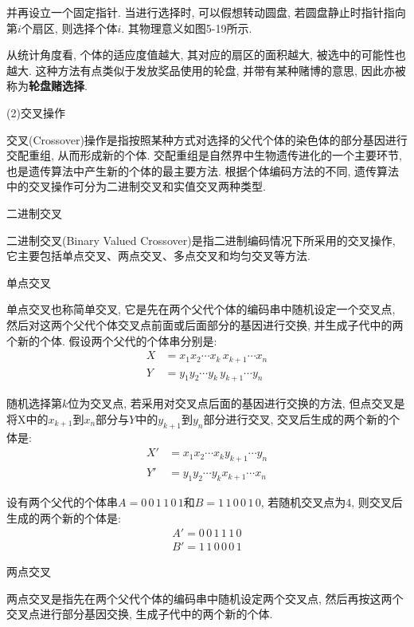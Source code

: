 并再设立一个固定指针. 当进行选择时, 可以假想转动圆盘, 若圆盘静止时指针指向第$i$个扇区, 则选择个体$i$. 其物理意义如图5-19所示.

从统计角度看, 个体的适应度值越大, 其对应的扇区的面积越大, 被选中的可能性也越大. 这种方法有点类似于发放奖品使用的轮盘, 并带有某种赌博的意思, 因此亦被称为\textbf{轮盘赌选择}.

(2)交叉操作

交叉(Crossover)操作是指按照某种方式对选择的父代个体的染色体的部分基因进行交配重组, 从而形成新的个体. 交配重组是自然界中生物遗传进化的一个主要环节, 也是遗传算法中产生新的个体的最主要方法. 根据个体编码方法的不同, 遗传算法中的交叉操作可分为二进制交叉和实值交叉两种类型.

     二进制交叉

    二进制交叉(Binary Valued Crossover)是指二进制编码情况下所采用的交叉操作, 它主要包括单点交叉、两点交叉、多点交叉和均匀交叉等方法.


     单点交叉

    单点交叉也称简单交叉, 它是先在两个父代个体的编码串中随机设定一个交叉点, 然后对这两个父代个体交叉点前面或后面部分的基因进行交换, 并生成子代中的两个新的个体. 假设两个父代的个体串分别是:
\begin{align}
    X&=x_1 x_2 \cdots x_k\, x_{k+1} \cdots x_n\\
    Y&=y_1 y_2 \cdots y_k\,  y_{k+1} \cdots y_n
\end{align}

    随机选择第$k$位为交叉点, 若采用对交叉点后面的基因进行交换的方法, 但点交叉是将X中的$x_{k+1}$到$x_n$部分与$Y$中的$y_{k+1}$到$y_n$部分进行交叉, 交叉后生成的两个新的个体是:
\begin{align}
    X'&= x_1 x_2 \cdots x_k y_{k+1} \cdots y_n\\
    Y'&= y_1 y_2 \cdots y_k x_{k+1} \cdots x_n
\end{align}
\begin{example}
设有两个父代的个体串$A=0\, 0\,  1\,  1\,  0\,  1$和$B=1\,  1\,  0\,  0\,  1\,  0$, 若随机交叉点为4, 则交叉后生成的两个新的个体是:
\begin{align}
    A'= 0\, 0\, 1\, 1\, 1\, 0\\
    B'= 1\, 1\, 0\, 0\, 0\, 1
\end{align}
\end{example}

     两点交叉

两点交叉是指先在两个父代个体的编码串中随机设定两个交叉点, 然后再按这两个交叉点进行部分基因交换, 生成子代中的两个新的个体.

